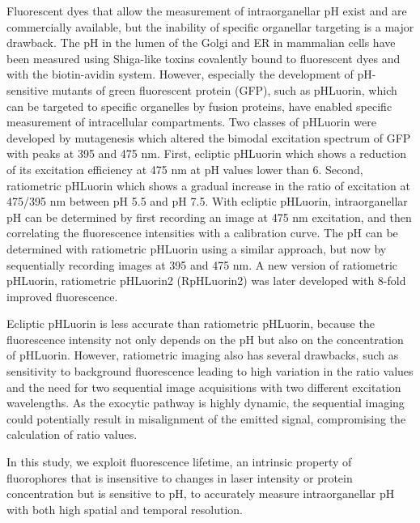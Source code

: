 Fluorescent dyes that allow the measurement of intraorganellar pH exist and are commercially available\cite{johnson_position_2016,damore_synthesis_2018,overly_quantitative_1995,liu_real-time_2019,ma_live-cell_2017}, but the inability of specific organellar targeting is a major drawback. The pH in the lumen of the Golgi and ER in mammalian cells have been measured using Shiga-like toxins covalently bound to fluorescent dyes\cite{kim_dynamic_1996,kim_noninvasive_1998} and with the biotin-avidin system\cite{wu_organelle_2000}. However, especially the development of pH-sensitive mutants of green fluorescent protein (GFP), such as pHLuorin\cite{miesenbock_visualizing_1998,mahon_phluorin2:_2011}, which can be targeted to specific organelles by fusion proteins, have enabled specific measurement of intracellular compartments. Two classes of pHLuorin were developed by mutagenesis which altered the bimodal excitation spectrum of GFP with peaks at 395 and 475 nm\cite{miesenbock_visualizing_1998,ward_spectral_1982}. First, ecliptic pHLuorin which shows a reduction of its excitation efficiency at 475 nm at pH values lower than 6. Second, ratiometric pHLuorin which shows a gradual increase in the ratio of excitation at 475/395 nm between pH 5.5 and pH 7.5\cite{miesenbock_visualizing_1998}. With ecliptic pHLuorin, intraorganellar pH can be determined by first recording an image at 475 nm excitation, and then correlating the fluorescence intensities with a calibration curve. The pH can be determined with ratiometric pHLuorin using a similar approach, but now by sequentially recording images at 395 and 475 nm. A new version of ratiometric pHLuorin, ratiometric pHLuorin2 (RpHLuorin2) was later developed with 8-fold improved fluorescence\cite{mahon_phluorin2:_2011}.

Ecliptic pHLuorin is less accurate than ratiometric pHLuorin, because the fluorescence intensity not only depends on the pH but also on the concentration of pHLuorin. However, ratiometric imaging also has several drawbacks, such as sensitivity to background fluorescence leading to high variation in the ratio values and the need for two sequential image acquisitions with two different excitation wavelengths. As the exocytic pathway is highly dynamic, the sequential imaging could potentially result in misalignment of the emitted signal, compromising the calculation of ratio values.

In this study, we exploit fluorescence lifetime, an intrinsic property of fluorophores that is insensitive to changes in laser intensity or protein concentration\cite{wallrabe_imaging_2005,jares-erijman_fret_2003} but is sensitive to pH\cite{schmitt_egfp-phsens_2014,lin_fluorescence_2003}, to accurately measure intraorganellar pH with both high spatial and temporal resolution.

